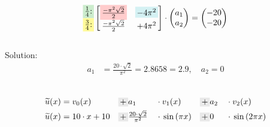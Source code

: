 \documentclass[
final,
a4paper,
oneside,
parskip=full,
headings=standardclasses,
headings=big,
pointednumbers,
fleqn
]{scrartcl}
\newcommand{\tfillg}[1]{\tfillc[#1][Green!20]}
\newcommand{\tfilly}[1]{\tfillc[#1][yellow!40]}
\newcommand{\tfillr}[1]{\tfillc[#1][red!20]}
\newcommand{\tfillt}[1]{\tfillc[#1][Turquoise!20]}
\newcommand{\tfillgr}[1]{\tfillc[#1][Gray!20]}
\newcommand{\fs}[2]{{\tfrac{#1}{#2}}}
\newcommand{\kl}[1]{{\left( #1 \right)}}
\begin{document}
    {\setlength{\abovedisplayskip}{-12pt}
    \setlength{\belowdisplayskip}{3pt}
    \begin{align*}
        \begin{matrix}
            \tfillg{$\fs{1}{4}$:} \\
            \tfilly{$\fs{3}{4}$:} \\
        \end{matrix}
        \begin{bmatrix}
            \tfillr{$\fs{-\pi^2 \sqrt{2}}{2}$} & \tfillt{$-4\pi^2$} \\
            \fs{-\pi^2 \sqrt{2}}{2} & +4\pi^2 \\
        \end{bmatrix} \cdot
        \begin{pmatrix}
            a_1 \\
            a_2
        \end{pmatrix} = 
        \begin{pmatrix}
            -20 \\
            -20
        \end{pmatrix} 
    \end{align*}} \\
    Solution: \\
    {\setlength{\abovedisplayskip}{-6pt}
    \setlength{\belowdisplayskip}{-24pt}
    \begin{align*}
    a_1 &= \fs{20 \cdot \sqrt{2}}{\pi^2} = 2.8658 = 2.9, \quad a_2 = 0 \\
    \end{align*}} \\
    {\setlength{\abovedisplayskip}{-12pt}
    \setlength{\belowdisplayskip}{-6pt}
    \begin{alignat*}{8}
        \widetilde{u}\kl{x} & = v_0\kl{x}       &{} \tfillgr{$+$} {} & a_1                           &{} \cdot {} &
                                v_1\kl{x}       &{} \tfillgr{$+$} {} & a_2 &{} \cdot {} & v_2\kl{x} \\
        \widetilde{u}\kl{x} & = 10 \cdot x + 10 &{} \tfillgr{$+$} {} & \fs{20 \cdot \sqrt{2}}{\pi^2} &{} \cdot {} &
                                \sin\kl{\pi x}  &{} \tfillgr{$+$} {} & 0 &{} \cdot {} & \sin\kl{2 \pi x} \\
    \end{alignat*}}
\end{document}
